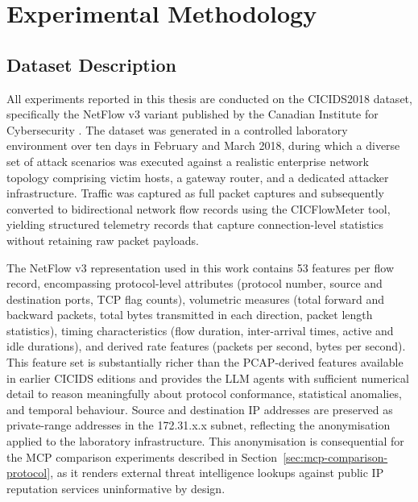 \documentclass[../main.tex]{subfiles}
\begin{document}
\chapter{Experimental Methodology}
\label{ch:methodology}

\section{Dataset Description}
\label{sec:dataset-description}

All experiments reported in this thesis are conducted on the CICIDS2018 dataset, specifically the NetFlow v3 variant published by the Canadian Institute for Cybersecurity \autocite{Sharafaldin2018}. The dataset was generated in a controlled laboratory environment over ten days in February and March 2018, during which a diverse set of attack scenarios was executed against a realistic enterprise network topology comprising victim hosts, a gateway router, and a dedicated attacker infrastructure. Traffic was captured as full packet captures and subsequently converted to bidirectional network flow records using the CICFlowMeter tool, yielding structured telemetry records that capture connection-level statistics without retaining raw packet payloads.

The NetFlow v3 representation used in this work contains 53 features per flow record, encompassing protocol-level attributes (protocol number, source and destination ports, TCP flag counts), volumetric measures (total forward and backward packets, total bytes transmitted in each direction, packet length statistics), timing characteristics (flow duration, inter-arrival times, active and idle durations), and derived rate features (packets per second, bytes per second). This feature set is substantially richer than the PCAP-derived features available in earlier CICIDS editions and provides the LLM agents with sufficient numerical detail to reason meaningfully about protocol conformance, statistical anomalies, and temporal behaviour. Source and destination IP addresses are preserved as private-range addresses in the 172.31.x.x subnet, reflecting the anonymisation applied to the laboratory infrastructure. This anonymisation is consequential for the MCP comparison experiments described in Section~\ref{sec:mcp-comparison-protocol}, as it renders external threat intelligence lookups against public IP reputation services uninformative by design.
\end{document}

